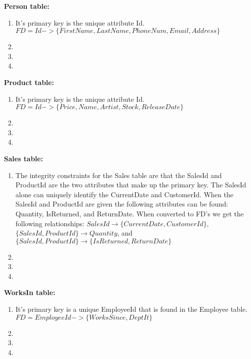 \documentclass{article}
\begin{document}
  \par\textbf{Person table:}
  \begin{enumerate}[label=\roman*]
  	\item It's primary key is the unique attribute Id. \newline
    $FD = Id -> \{FirstName, LastName, PhoneNum, Email, Address\}$
  	\item
  	\item
  	\item
  \end{enumerate}
  \par\textbf{Product table:}
  \begin{enumerate}[label=\roman*]
  	\item It's primary key is the unique attribute Id. \newline
    $FD = Id -> \{Price, Name, Artist, Stock, ReleaseDate\}$
  	\item
  	\item
  	\item
  \end{enumerate}
  \par\textbf{Sales table:}
  \begin{enumerate}[label=\roman*]
  	\item The integrity constraints for the Sales table are that the SalesId and ProductId are the two attributes that make up
    the primary key. The SalesId alone can uniquely identify the CurrentDate and CustomerId. When the SalesId and ProductId are given
    the following attributes can be found: Quantity, IsReturned, and ReturnDate. When converted to FD's we get the following
    relationships: $SalesId\rightarrow\{CurrentDate,CustomerId\}$, $\{SalesId,ProductId\}\rightarrow Quantity$, and 
    $\{SalesId,ProductId\}\rightarrow\{IsReturned,ReturnDate\}$
  	\item
  	\item
  	\item
  \end{enumerate}
  \par\textbf{WorksIn table:}
  \begin{enumerate}[label=\roman*]
  	\item It's primary key is a unique EmployeeId that is found in the Employee table. \newline
    $FD = EmployeeId -> \{WorksSince, DeptIt\}$
  	\item
  	\item
  	\item
  \end{enumerate}
\end{document}
